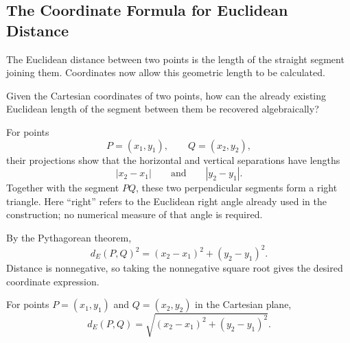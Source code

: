\subsection{The Coordinate Formula for Euclidean Distance}

The Euclidean distance between two points is the length of the straight segment
joining them. Coordinates now allow this geometric length to be calculated.

\begin{corebox}
Given the Cartesian coordinates of two points, how can the already existing
Euclidean length of the segment between them be recovered algebraically?
\end{corebox}

For points
\[
P=(x_1,y_1),
\qquad
Q=(x_2,y_2),
\]
their projections show that the horizontal and vertical separations have
lengths
\[
|x_2-x_1|
\qquad\text{and}\qquad
|y_2-y_1|.
\]
Together with the segment $PQ$, these two perpendicular segments form a right
triangle. Here ``right'' refers to the Euclidean right angle already used in the
construction; no numerical measure of that angle is required.

\begin{center}
\end{center}

\begin{derivationbox}
By the Pythagorean theorem,
\[
d_E(P,Q)^2
=
(x_2-x_1)^2+(y_2-y_1)^2.
\]
Distance is nonnegative, so taking the nonnegative square root gives the desired
coordinate expression.
\end{derivationbox}

\begin{theorembox}
For points $P=(x_1,y_1)$ and $Q=(x_2,y_2)$ in the Cartesian plane,
\[
\boxed{
d_E(P,Q)
=
\sqrt{(x_2-x_1)^2+(y_2-y_1)^2}
}.
\]
\end{theorembox}


